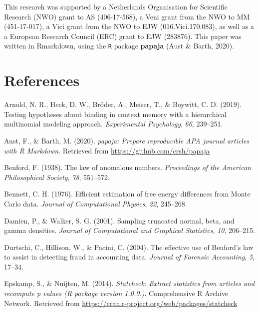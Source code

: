 \documentclass[
  english,
  man,floatsintext]{apa6}
\begin{document}
This research was supported by a Netherlands Organisation for Scientific Research (NWO) grant
to AS (406-17-568), a Veni grant from the NWO to MM (451-17-017), a Vici grant from the NWO to EJW (016.Vici.170.083), as well as a a European Research Council (ERC) grant to EJW (283876). This paper was written in Rmarkdown, using the \texttt{R} package \textbf{papaja} (Aust \& Barth, 2020).

\clearpage

\hypertarget{references}{%
\section{References}\label{references}}

\begingroup
\setlength{\parindent}{-0.5in}
\setlength{\leftskip}{0.5in}

\hypertarget{refs}{}
\leavevmode\hypertarget{ref-arnold2019testing}{}%
Arnold, N. R., Heck, D. W., Bröder, A., Meiser, T., \& Boywitt, C. D. (2019). Testing hypotheses about binding in context memory with a hierarchical multinomial modeling approach. \emph{Experimental Psychology}, \emph{66}, 239--251.

\leavevmode\hypertarget{ref-papaja}{}%
Aust, F., \& Barth, M. (2020). \emph{papaja: Prepare reproducible APA journal articles with R Markdown}. Retrieved from \url{https://github.com/crsh/papaja}

\leavevmode\hypertarget{ref-benford1938law}{}%
Benford, F. (1938). The law of anomalous numbers. \emph{Proceedings of the American Philosophical Society}, \emph{78}, 551--572.

\leavevmode\hypertarget{ref-bennett1976efficient}{}%
Bennett, C. H. (1976). Efficient estimation of free energy differences from Monte Carlo data. \emph{Journal of Computational Physics}, \emph{22}, 245--268.

\leavevmode\hypertarget{ref-damien2001sampling}{}%
Damien, P., \& Walker, S. G. (2001). Sampling truncated normal, beta, and gamma densities. \emph{Journal of Computational and Graphical Statistics}, \emph{10}, 206--215.

\leavevmode\hypertarget{ref-durtschi2004effective}{}%
Durtschi, C., Hillison, W., \& Pacini, C. (2004). The effective use of Benford's law to assist in detecting fraud in accounting data. \emph{Journal of Forensic Accounting}, \emph{5}, 17--34.

\leavevmode\hypertarget{ref-epskamp2014statcheck}{}%
Epskamp, S., \& Nuijten, M. (2014). \emph{Statcheck: Extract statistics from articles and recompute p values (R package version 1.0.0.)}. Comprehensive R Archive Network. Retrieved from \url{https://cran.r-project.org/web/packages/statcheck}
\end{document}
